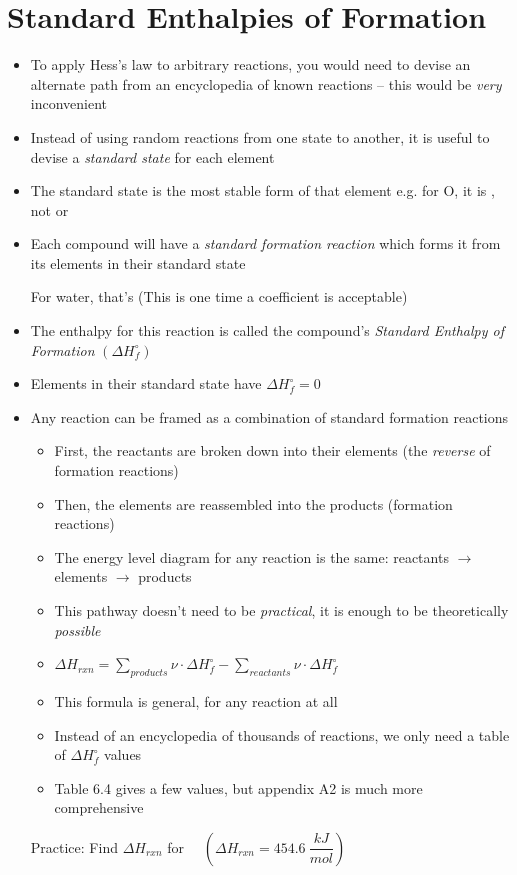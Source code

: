 \documentclass[12pt, openany, letterpaper]{memoir}
\begin{document}
\section{Standard Enthalpies of Formation}
\begin{itemize}
	\item To apply Hess's law to arbitrary reactions, you would need to devise an alternate path from an encyclopedia of known reactions -- this would be \emph{very} inconvenient
	\item Instead of using random reactions from one state to another, it is useful to devise a \emph{standard state} for each element
	\item The standard state is the most stable form of that element e.g. for O, it is , not  or 
	\item Each compound will have a \emph{standard formation reaction} which forms it from its elements in their standard state

	      For water, that's  \hspace{1em} (This is one time a  coefficient is acceptable)
	\item The enthalpy for this reaction is called the compound's \emph{Standard Enthalpy of Formation} $\left(\Delta H^\circ_f\right)$
	\item Elements in their standard state have $\Delta H^\circ_f = 0$
	\item Any reaction can be framed as a combination of standard formation reactions
	      \begin{itemize}
		      \item First, the reactants are broken down into their elements (the \emph{reverse} of formation reactions)
		      \item Then, the elements are reassembled into the products (formation reactions)
		      \item The energy level diagram for any reaction is the same: reactants $\rightarrow$ elements $\rightarrow$ products
		      \item This pathway doesn't need to be \emph{practical}, it is enough to be theoretically \emph{possible}
		      \item $\Delta H_{rxn}=\sum\limits_{products}\nu\cdot\Delta H^\circ_f - \sum\limits_{reactants}\nu\cdot\Delta H^\circ_f$
		      \item This formula is general, for any reaction at all
		      \item Instead of an encyclopedia of thousands of reactions, we only need a table of $\Delta H^\circ_f$ values
		      \item Table 6.4 gives a few values, but appendix A2 is much more comprehensive
	      \end{itemize}
	      Practice: Find $\Delta H_{rxn}$ for~~  \hspace{1em} $\left(\Delta H_{rxn}=454.6~\dfrac{kJ}{mol}\right)$


\end{itemize}
\end{document}
